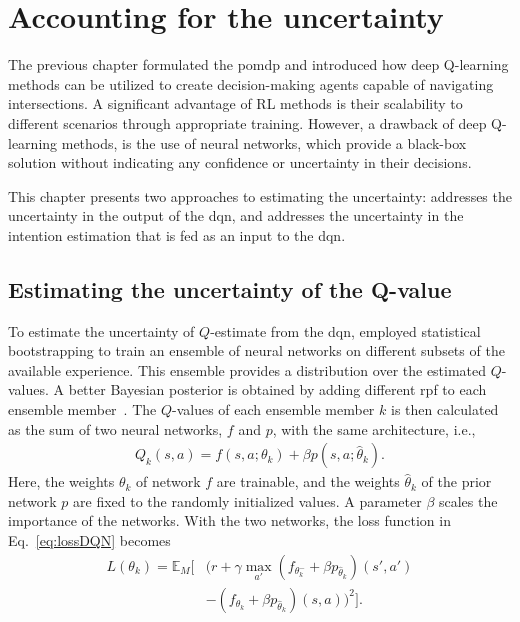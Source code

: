 \chapter{Accounting for the uncertainty}\label{ch:uncertainty}

The previous chapter formulated the \gls{pomdp} and introduced how deep Q-learning methods can be utilized to create decision-making agents capable of navigating intersections. A significant advantage of RL methods is their scalability to different scenarios through appropriate training. However, a drawback of deep Q-learning methods, is the use of neural networks, which provide a black-box solution without indicating any confidence or uncertainty in their decisions.

This chapter presents two approaches to estimating the uncertainty: \paperEnsamble addresses the uncertainty in the output of the \gls{dqn}, and \paperBelief addresses the uncertainty in the intention estimation that is fed as an input to the \gls{dqn}.

\section{Estimating the uncertainty of the Q-value}

To estimate the uncertainty of $Q$-estimate from the \gls{dqn}, \paperEnsamble employed statistical bootstrapping to train an ensemble of neural networks on different subsets of the available experience. This ensemble provides a distribution over the estimated $Q$-values. A better Bayesian posterior is obtained by adding different \gls{rpf} to each ensemble member~\cite{Osband2018}.
The $Q$-values of each ensemble member $k$ is then calculated as the sum of two neural networks, $f$ and $p$, with the same architecture, i.e.,
%
\begin{align}
	Q_k(s,a) = f(s,a;\theta_k) + \beta p(s,a;\hat{\theta}_k).
\end{align}
Here, the weights $\theta_k$ of network $f$ are trainable, and the weights $\hat{\theta}_k$ of the prior network $p$ are fixed to the randomly initialized values. A parameter $\beta$ scales the importance of the networks. With the two networks, the loss function in Eq.~\ref{eq:lossDQN} becomes
%
\begin{align}
	\label{eq:loss_boot}
	L(\theta_k) = \mathbb{E}_M \Big[ & (r + \gamma \max_{a'} (f_{\theta^-_k}+\beta p_{\hat{\theta}_k})(s',a') \nonumber \\
	& - (f_{\theta_k}+ \beta p_{\hat{\theta}_k})(s,a) )^2 \Big].
\end{align} 

